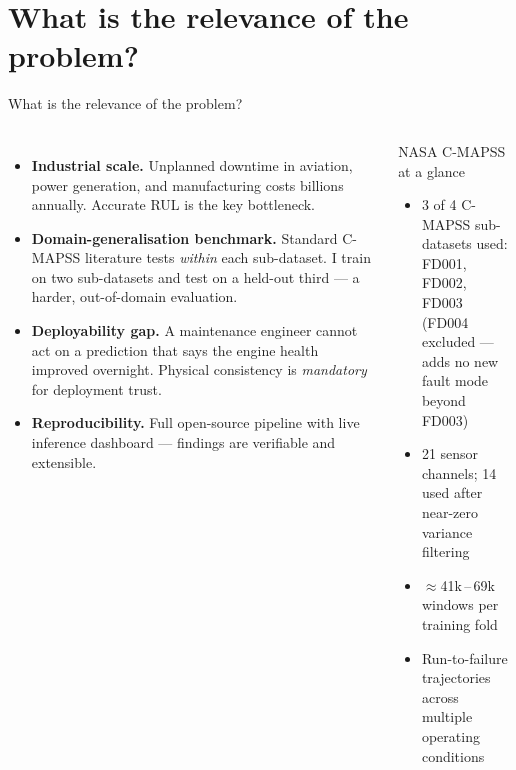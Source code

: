 \documentclass[10pt, aspectratio=169, handout]{beamer}
\begin{document}
\section{What is the relevance of the problem?}

\begin{frame}{What is the relevance of the problem?}
  \begin{columns}[T]
      \small
      \begin{itemize}
        \setlength\itemsep{5pt}
        \item<1-> \textbf{Industrial scale.} Unplanned downtime in aviation,
              power generation, and manufacturing costs billions annually.
              Accurate RUL is the key bottleneck.
        \item<2-> \textbf{Domain-generalisation benchmark.} Standard C-MAPSS literature
              tests \emph{within} each sub-dataset. I train on two sub-datasets and test
              on a held-out third --- a harder, out-of-domain evaluation.
        \item<3-> \textbf{Deployability gap.} A maintenance engineer cannot act
              on a prediction that says the engine health improved overnight.
              Physical consistency is \emph{mandatory} for deployment trust.
        \item<4-> \textbf{Reproducibility.} Full open-source pipeline with live
              inference dashboard --- findings are verifiable and extensible.
      \end{itemize}
      \begin{block}{NASA C-MAPSS at a glance}
        \small
        \begin{itemize}
          \item 3 of 4 C-MAPSS sub-datasets used: FD001, FD002, FD003\\(FD004 excluded --- adds no new fault mode beyond FD003)
          \item 21 sensor channels; 14 used after\\near-zero variance filtering
          \item $\approx$41k\,--\,69k windows per training fold
          \item Run-to-failure trajectories across\\multiple operating conditions
        \end{itemize}

\end{block}
\end{columns}
\end{frame}
\end{document}

